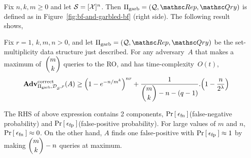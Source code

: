 Fix $n,k,m \geq 0$ and let $\mathcal{S}=[{\cal X}]^n$.  Then $\Pi_{\mathrm{garb}}= (\calQ,\Rep, \Qry)$ is defined as in Figure~\ref{fig:bf-and-garbled-bf} (right side).  The following result shows,

\begin{theorem}\label{thm:gbf-correctness}
Fix $r=1$, $k,m,n>0$, and let $\Pi_{\mathrm{garb}}= (\calQ,\Rep, \Qry)$ be the set-multiplicity data structure just described. For any adversary~$A$ that makes a maximum of~$\dbinom{m}{k}$ queries to the RO, and has time-complexity~$O(t)$,
\[
\mathrm{\mathbf{Adv}}^{\mathrm{correct}}_{\Pi_{\mathrm{garb}},\mathcal{D}_{{\cal S}}^{},r}(A)  \geq   \left(1 - e^{-n/m^k}\right)^{nr} + \dfrac{1}{\dbinom{m}{k}-n-(q-1)} . \Big(1-\dfrac{n}{2^\lambda}\Big)
\]

The RHS of above expression contains 2 components, $\Pr\left[\: \epsilon_{\mathrm{fn}} \:\right]$(false-negative probability) and $\Pr\left[\: \epsilon_{\mathrm{fp}} \:\right]$(false-positive probability). For large values of $m$ and $n$, $\Pr\left[\: \epsilon_{\mathrm{fn}} \:\right] \approx 0$. On the other hand, $A$ finds one false-positive with $\Pr\left[\: \epsilon_{\mathrm{fp}} \:\right] \approx 1$ by making $\dbinom{m}{k} - n$ queries at maximum.

\end{theorem}

